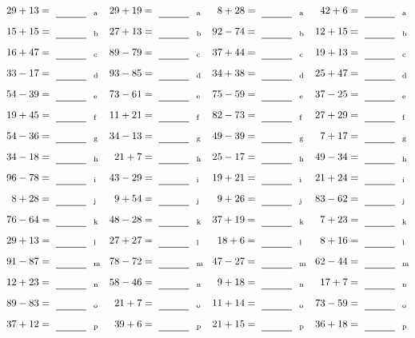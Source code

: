 \documentclass
[
  draft    = true,
  fontsize = 11pt,
  parskip  = half-
]
{scrartcl}
\begin{document}
\clearpage
\begin{align*}
    \pline{29+13}&=\rline{a}
  & \pline{29+19}&=\rline{a}
  & \pline{8+28}&=\rline{a}
  & \pline{42+6}&=\rline{a} \\[1ex]
    \pline{15+15}&=\rline{b}
  & \pline{27+13}&=\rline{b}
  & \pline{92-74}&=\rline{b}
  & \pline{12+15}&=\rline{b} \\[1ex]
    \pline{16+47}&=\rline{c}
  & \pline{89-79}&=\rline{c}
  & \pline{37+44}&=\rline{c}
  & \pline{19+13}&=\rline{c} \\[1ex]
    \pline{33-17}&=\rline{d}
  & \pline{93-85}&=\rline{d}
  & \pline{34+38}&=\rline{d}
  & \pline{25+47}&=\rline{d} \\[1ex]
    \pline{54-39}&=\rline{e}
  & \pline{73-61}&=\rline{e}
  & \pline{75-59}&=\rline{e}
  & \pline{37-25}&=\rline{e} \\[1ex]
    \pline{19+45}&=\rline{f}
  & \pline{11+21}&=\rline{f}
  & \pline{82-73}&=\rline{f}
  & \pline{27+29}&=\rline{f} \\[1ex]
    \pline{54-36}&=\rline{g}
  & \pline{34-13}&=\rline{g}
  & \pline{49-39}&=\rline{g}
  & \pline{7+17}&=\rline{g} \\[1ex]
    \pline{34-18}&=\rline{h}
  & \pline{21+7}&=\rline{h}
  & \pline{25-17}&=\rline{h}
  & \pline{49-34}&=\rline{h} \\[1ex]
    \pline{96-78}&=\rline{i}
  & \pline{43-29}&=\rline{i}
  & \pline{19+21}&=\rline{i}
  & \pline{21+24}&=\rline{i} \\[1ex]
    \pline{8+28}&=\rline{j}
  & \pline{9+54}&=\rline{j}
  & \pline{9+26}&=\rline{j}
  & \pline{83-62}&=\rline{j} \\[1ex]
    \pline{76-64}&=\rline{k}
  & \pline{48-28}&=\rline{k}
  & \pline{37+19}&=\rline{k}
  & \pline{7+23}&=\rline{k} \\[1ex]
    \pline{29+13}&=\rline{l}
  & \pline{27+27}&=\rline{l}
  & \pline{18+6}&=\rline{l}
  & \pline{8+16}&=\rline{l} \\[1ex]
    \pline{91-87}&=\rline{m}
  & \pline{78-72}&=\rline{m}
  & \pline{47-27}&=\rline{m}
  & \pline{62-44}&=\rline{m} \\[1ex]
    \pline{12+23}&=\rline{n}
  & \pline{58-46}&=\rline{n}
  & \pline{9+18}&=\rline{n}
  & \pline{17+7}&=\rline{n} \\[1ex]
    \pline{89-83}&=\rline{o}
  & \pline{21+7}&=\rline{o}
  & \pline{11+14}&=\rline{o}
  & \pline{73-59}&=\rline{o} \\[1ex]
    \pline{37+12}&=\rline{p}
  & \pline{39+6}&=\rline{p}
  & \pline{21+15}&=\rline{p}
  & \pline{36+18}&=\rline{p}
\end{align*}
\end{document}
